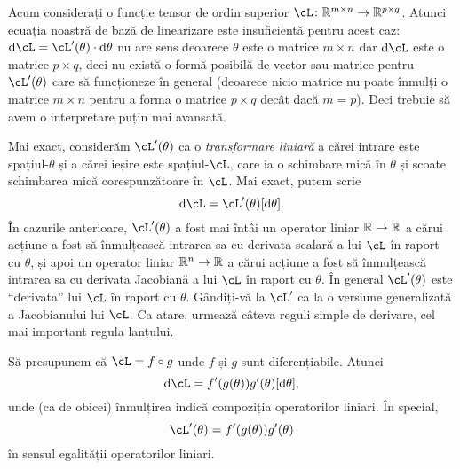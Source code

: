 \documentclass[../../book-main_ro.tex]{subfiles}
\begin{document}
Acum considerați o funcție tensor de ordin superior \(\cL \colon \R^{m \times n} \to \R^{p \times q}\). Atunci ecuația noastră de bază de linearizare este insuficientă pentru acest caz: \(\odif{\cL} = \cL^{\prime}(\theta) \cdot \odif{\theta}\) nu are sens deoarece \(\theta\) este o matrice \(m \times n\) dar \(\odif{\cL}\) este o matrice \(p \times q\), deci nu există o formă posibilă de vector sau matrice pentru \(\cL^{\prime}(\theta)\) care să funcționeze în general (deoarece nicio matrice nu poate înmulți o matrice \(m \times n\) pentru a forma o matrice \(p \times q\) decât dacă \(m = p\)). Deci trebuie să avem o interpretare puțin mai avansată.

Mai exact, considerăm \(\cL^{\prime}(\theta)\) ca o \textit{transformare liniară} a cărei intrare este spațiul-\(\theta\) și a cărei ieșire este spațiul-\(\cL\), care ia o schimbare mică în \(\theta\) și scoate schimbarea mică corespunzătoare în \(\cL\). Mai exact, putem scrie
\begin{equation}
    \odif{\cL} = \cL^{\prime}(\theta)[\odif{\theta}].
\end{equation}
În cazurile anterioare, \(\cL^{\prime}(\theta)\) a fost mai întâi un operator liniar \(\mathbb{R} \to \mathbb{R}\) a cărui acțiune a fost să înmulțească intrarea sa cu derivata scalară a lui \(\cL\) în raport cu \(\theta\), și apoi un operator liniar \(\mathbb{R}^{n} \to \mathbb{R}\) a cărui acțiune a fost să înmulțească intrarea sa cu derivata Jacobiană a lui \(\cL\) în raport cu \(\theta\). În general \(\cL^{\prime}(\theta)\) este ``derivata'' lui \(\cL\) în raport cu \(\theta\).
Gândiți-vă la \(\cL^{\prime}\) ca la o versiune generalizată a Jacobianului lui \(\cL\).
Ca atare, urmează câteva reguli simple de derivare, cel mai important regula lanțului.

\begin{theorem}
    Să presupunem că \(\cL = f \circ g\) unde \(f\) și \(g\) sunt diferențiabile. Atunci
    \begin{equation}
        \odif{\cL} = f^{\prime}(g(\theta))g^{\prime}(\theta)[\odif{\theta}],
    \end{equation}
    unde (ca de obicei) înmulțirea indică compoziția operatorilor liniari. În special,
    \begin{equation}
        \cL^{\prime}(\theta) = f^{\prime}(g(\theta))g^{\prime}(\theta)
    \end{equation}
    în sensul egalității operatorilor liniari.
\end{theorem}
\end{document}
